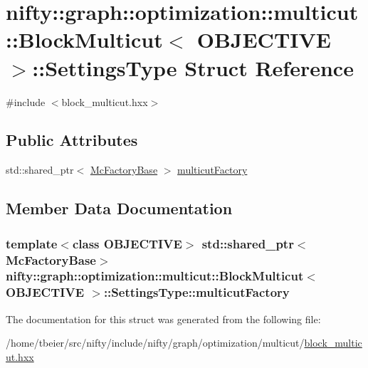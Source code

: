 \hypertarget{structnifty_1_1graph_1_1optimization_1_1multicut_1_1BlockMulticut_1_1SettingsType}{}\section{nifty\+:\+:graph\+:\+:optimization\+:\+:multicut\+:\+:Block\+Multicut$<$ O\+B\+J\+E\+C\+T\+I\+V\+E $>$\+:\+:Settings\+Type Struct Reference}
\label{structnifty_1_1graph_1_1optimization_1_1multicut_1_1BlockMulticut_1_1SettingsType}


{\ttfamily \#include $<$block\+\_\+multicut.\+hxx$>$}

\subsection*{Public Attributes}
\begin{DoxyCompactItemize}
\item 
std\+::shared\+\_\+ptr$<$ \hyperlink{classnifty_1_1graph_1_1optimization_1_1multicut_1_1BlockMulticut_a568ee0171f58ef95b5b32a4d15aaf2f5}{Mc\+Factory\+Base} $>$ \hyperlink{structnifty_1_1graph_1_1optimization_1_1multicut_1_1BlockMulticut_1_1SettingsType_abca9fb223275bd41ff426cd0544094ae}{multicut\+Factory}
\end{DoxyCompactItemize}


\subsection{Member Data Documentation}
\hypertarget{structnifty_1_1graph_1_1optimization_1_1multicut_1_1BlockMulticut_1_1SettingsType_abca9fb223275bd41ff426cd0544094ae}{}
\subsubsection[{multicut\+Factory}]{\setlength{\rightskip}{0pt plus 5cm}template$<$class O\+B\+J\+E\+C\+T\+I\+V\+E$>$ std\+::shared\+\_\+ptr$<${\bf Mc\+Factory\+Base}$>$ {\bf nifty\+::graph\+::optimization\+::multicut\+::\+Block\+Multicut}$<$ O\+B\+J\+E\+C\+T\+I\+V\+E $>$\+::Settings\+Type\+::multicut\+Factory}\label{structnifty_1_1graph_1_1optimization_1_1multicut_1_1BlockMulticut_1_1SettingsType_abca9fb223275bd41ff426cd0544094ae}


The documentation for this struct was generated from the following file\+:\begin{DoxyCompactItemize}
\item 
/home/tbeier/src/nifty/include/nifty/graph/optimization/multicut/\hyperlink{block__multicut_8hxx}{block\+\_\+multicut.\+hxx}\end{DoxyCompactItemize}
